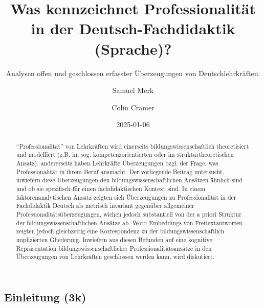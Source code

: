 \documentclass[
  letterpaper,
  DIV=11]{scrartcl}
\title{Was kennzeichnet Professionalität in der Deutsch-Fachdidaktik
(Sprache)?}
\subtitle{Analysen offen und geschlossen erfasster Überzeugungen von
Deutschlehrkräften.}
\author{Samuel Merk \and Colin Cramer}
\date{2025-01-06}
\begin{document}
\maketitle
\begin{abstract}
``Professionalität'' von Lehrkräften wird einerseits
bildungswissenschaftlich theoretisiert und modelliert (z.B. im sog.
kompetenzorientierten oder im strukturtheoretischen Ansatz),
andererseits haben Lehrkräfte Überzeugungen bzgl. der Frage, was
Professionalität in ihrem Beruf ausmacht. Der vorliegende Beitrag
untersucht, inwiefern diese Überzeugungen den bildungswissenschaftlichen
Ansätzen ähnlich sind und ob sie spezifisch für einen fachdidaktischen
Kontext sind. In einem faktorenanalytischen Ansatz zeigten sich
Überzeugungen zu Professionalität in der Fachdidaktik Deutsch als
metrisch invariant gegenüber allgemeiner Professionalitätsüberzeugungen,
wichen jedoch substantiell von der a priori Struktur der
bildungswissenschaftlichen Ansätze ab. Word Embeddings von
Freitextantworten zeigten jedoch gleichzeitig eine Korrespondenz zu der
bildungswissenschaftlich implizierten Gliederung. Inwiefern aus diesen
Befunden auf eine kognitive Repräsentation bildungswissenschaftlicher
Professionalitätsansätze in den Überzeugungen von Lehrkräften
geschlossen werden kann, wird diskutiert.
\end{abstract}


\subsection{Einleitung (3k)}\label{einleitung-3k}
\end{document}
